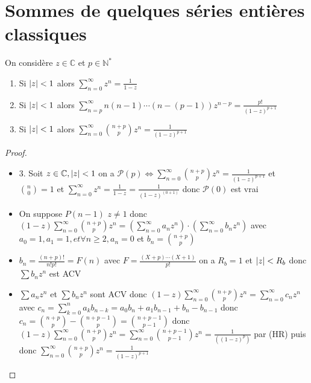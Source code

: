 \documentclass[11pt,hidelinks]{book}
\theoremstyle{mytheoremstyle}
\theoremstyle{mytheoremstyle}
\theoremstyle{mytheoremstyle}
\theoremstyle{mytheoremstyle}
\theoremstyle{mytheoremstyle}
\theoremstyle{mytheoremstyle}
\theoremstyle{mytheoremstyle}
\theoremstyle{mytheoremstyle}
\theoremstyle{myproblemstyle}
\def\mbb#1{\mathbb{#1}}
\def\mfc#1{\mathcal{#1}}
\def\bN{\mbb{N}}
\def\bC{\mbb{C}}
\def\is#1{\sum_{n=0}^\infty #1}
\def\iss#1#2{\sum_{n=#1}^\infty #2}
\def\se{\sum a_n z^n}
\def\seb#1{\sum #1_n z^n}
\newcommand{\parenth}[1]{\left(#1\right)}
\begin{document}
\section{Sommes de quelques séries entières classiques}
\begin{adjustwidth}{-2em}{-1em}
    \begin{prop}
        On considère $z \in \bC$ et $p \in \bN^*$
        \begin{enumerate} 
        \item Si $\abs{z} < 1$ alors $\is{z^n} = \frac{1}{1-z}$ 
        \item Si $\abs{z} < 1$ alors $\iss{p}{n(n-1)\cdots (n-(p-1))z^{n-p}} = \frac{p!}{(1-z)^{p+1}}$ 
        \item Si $\abs{z} < 1$ alors $\is{\binom{n+p}{p}z^n} = \frac{1}{(1-z)^{p+1}}$
        \end{enumerate}
        \begin{proof}
            \begin{itemize}[label=$\cdot$]
            \item 3. Soit $z \in \bC, \abs{z} < 1$ on a $\mfc{P}(p) \Leftrightarrow \is{\binom{n+p}{p}z^n} = \frac{1}{(1-z)^{p+1}}$
            et  
            $\binom{n}{0} = 1$ et $\is{z^n} = \frac{1}{1-z} = \frac{1}{(1-z)^(0+1)}$ donc $\mfc{P}(0)$ est vrai 
             

            \item On suppose $P(n-1)$ 
            $z \not= 1$ donc $(1-z)\is{\binom{n+p}{p}z^n} = \parenth{\is{a_nz^n}} \cdot \parenth{\is{b_nz^n}}$
            avec $a_0 = 1, a_1 = 1, et \forall n \geq 2, a_n = 0$ et $b_n = \binom{n+p}{p}$

            \item \begin{rmq}
                $b_n = \frac{(n+p)!}{n!p!} = F(n)$ avec \newline $F = \frac{(X+p)\cdots(X+1)}{p!}$ on a $R_b = 1$ et $\abs{z} < R_b$ donc $\seb{b}$ est ACV
            \end{rmq}
            
            \item $\se$ et $\seb{b}$ sont ACV donc $(1-z)\is{\binom{n+p}{p}z^n} = \is{c_nz^n}$ avec $c_n = \sum_{k=0}^n a_k b_{n-k} = a_0 b_n + a_1 b_{n-1} + b_n - b_{n-1}$
            donc $c_n = \binom{n+p}{p} - \binom{n+p-1}{p} = \binom{n+p-1}{p-1}$ 
            donc $(1-z)\is{\binom{n+p}{p}z^n} = \is{\binom{n+p-1}{p-1}z^n} = \frac{1}{((1-z)^p)}$ par (HR)
            puis donc $\is{\binom{n+p}{p}z^n} = \frac{1}{(1-z)^{p+1}}$ 


\end{itemize}
\end{proof}
\end{prop}
\end{adjustwidth}
\end{document}
